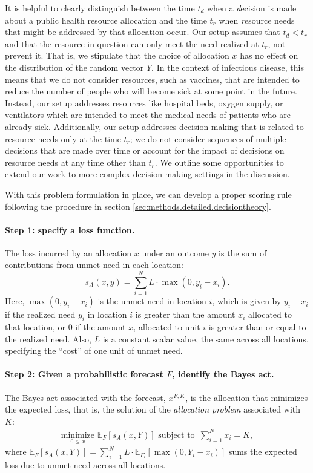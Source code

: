 \documentclass{article}\usepackage[]{graphicx}\usepackage[]{xcolor}
\begin{document}
It is helpful to clearly distinguish between the time $t_d$ when a \emph{d}ecision is made about a public health
resource allocation and the time $t_r$ when \emph{r}esource needs that might be addressed by that allocation occur. Our
setup assumes that $t_d < t_r$ and that the resource in question can only meet the need realized at $t_r$, not prevent
it. That is, we stipulate that the choice of allocation $x$ has no effect on the distribution of the random vector $Y$. In the
context of infectious disease, this means that we do not consider resources, such as vaccines, that are intended to
reduce the number of people who will become sick at some point in the future. Instead, our setup addresses resources
like hospital beds, oxygen supply, or ventilators which are intended to meet the medical needs of patients who are
already sick. Additionally, our setup addresses decision-making that is related to resource needs only at the time
$t_r$; we do not consider sequences of multiple decisions that are made over time or account for the impact of decisions
on resource needs at any time other than $t_r$. We outline some opportunities to extend our work to more complex
decision making settings in the discussion.

With this problem formulation in place, we can develop a proper scoring rule following the procedure in section
\ref{sec:methods.detailed.decisiontheory}.

\paragraph{Step 1: specify a loss function.} The loss incurred by an allocation $x$ under an outcome $y$ is the sum of
contributions from unmet need in each location:
\begin{equation}
  s_A(x, y) = \sum_{i=1}^N L \cdot \max(0, y_i - x_i). \label{eqn:loss_fn}
\end{equation}
Here, $\max(0, y_i - x_i)$ is the unmet need in location $i$, which is given by $y_i - x_i$ if the realized need $y_i$
in location $i$ is greater than the amount $x_i$ allocated to that location, or $0$ if the amount $x_i$ allocated to
unit $i$ is greater than or equal to the realized need. Also, $L$ is a constant scalar value, the same across all
locations, specifying the ``cost'' of one unit of unmet need.

\paragraph{Step 2: Given a probabilistic forecast $F$, identify the Bayes act.} The Bayes act associated with the
forecast, $x^{F,K}$, is the allocation that minimizes the expected loss, that is, the solution of the \emph{allocation
problem} associated with $K$:
\begin{align}
  \underset{0 \leq x}{\mathrm{minimize}}\,\, \mathbb{E}_{F} [s_A(x, Y)] \text{ subject to }
  \, \sum_{i=1}^N x_i = K, \label{eqn:AP}
\end{align}
where $\mathbb{E}_{F} [s_A(x, Y)] = \sum_{i=1}^{N} L \cdot \mathbb{E}_{F_i}[\max(0, Y_i - x_i)]$ sums the expected loss
due to unmet need across all locations.
\end{document}
